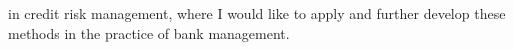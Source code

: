 in {credit risk management}, where I would like to apply and further develop these methods in the practice of {bank management}.